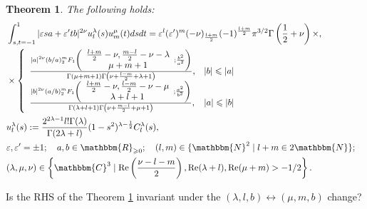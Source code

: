 \documentclass{article}
\newcommand{\assign}{:=}
\newcommand{\tmop}[1]{\ensuremath{\operatorname{#1}}}
\newtheorem{theorem}{Theorem}
\begin{document}
\begin{theorem}
  \label{thm-1} The following holds:
  \begin{eqnarray}
    & \int_{s, t = - 1}^1 | \varepsilon s a + \varepsilon' t b |^{2 \nu}
    u_l^{\lambda} (s) u_m^{\mu} (t) d s d t = \varepsilon^l (\varepsilon')^m
    (- \nu)_{\frac{l + m}{2}} (- 1)^{\frac{l + m}{2}} \pi^{3 / 2} \Gamma
    \left( \frac{1}{2} + \nu \right) \times, &  \nonumber\\
    & \times \left\{ \begin{array}{ll}
      \frac{| a |^{2 \nu} (b / a)^m _2 F_1 \left( \begin{array}{c}
        \frac{l + m}{2} - \nu, \frac{m - l}{2} - \nu - \lambda\\
        \mu + m + 1
      \end{array} ; \frac{b^2}{a^2} \right)}{\Gamma (\mu + m + 1) \Gamma
      \left( \nu + \frac{l - m}{2} + \lambda + 1 \right)}, & | b | \leqslant |
      a |\\
      \frac{| b |^{2 \nu} (a / b)^m _2 F_1 \left( \begin{array}{c}
        \frac{l + m}{2} - \nu, \frac{l - m}{2} - \nu - \mu\\
        \lambda + l + 1
      \end{array} ; \frac{a^2}{b^2} \right)}{\Gamma (\lambda + l + 1) \Gamma
      \left( \nu + \frac{m - l}{2} + \mu + 1 \right)}, & | a | \leqslant | b |
    \end{array} \right. &  \nonumber\\
    & u_l^{\lambda} (s) \assign \frac{2^{2 \lambda - 1} l! \Gamma
    (\lambda)}{\Gamma (2 \lambda + l)} (1 - s^2)^{\lambda - \frac{1}{2}}
    C_l^{\lambda} (s), &  \nonumber\\
    & \varepsilon, \varepsilon' = \pm 1 ; \quad a, b \in
    \mathbbm{R}_{\geqslant 0} ; \quad (l, m) \in \{ \mathbbm{N}^2 \mid l + m
    \in 2\mathbbm{N} \} ; &  \nonumber\\
    & (\lambda, \mu, \nu) \in \left\{ \mathbbm{C}^3 \mid \tmop{Re} \left(
    \frac{\nu - l - m}{2} \right), \tmop{Re} (\lambda + l), \tmop{Re} (\mu +
    m) > - 1 / 2 \right\} . &  \nonumber
  \end{eqnarray}
\end{theorem}

\begin{question}
  Is the RHS of the Theorem \ref{thm-1} invariant under the $(\lambda, l, b)
  \leftrightarrow (\mu, m, b)$ change?
\end{question}
\end{document}
